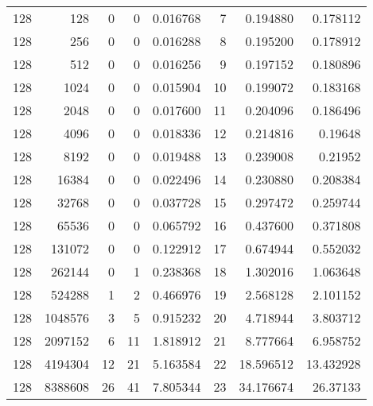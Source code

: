\begin{longtable}[c]{@{}rrrrrrrr@{}}
    128       & 128       & 0         & 0        & 0.016768    & 7                   & 0.194880    & 0.178112   \\
    128       & 256       & 0         & 0        & 0.016288    & 8                   & 0.195200    & 0.178912   \\
    128       & 512       & 0         & 0        & 0.016256    & 9                   & 0.197152    & 0.180896   \\
    128       & 1024      & 0         & 0        & 0.015904    & 10                  & 0.199072    & 0.183168   \\
    128       & 2048      & 0         & 0        & 0.017600    & 11                  & 0.204096    & 0.186496   \\
    128       & 4096      & 0         & 0        & 0.018336    & 12                  & 0.214816    & 0.19648    \\
    128       & 8192      & 0         & 0        & 0.019488    & 13                  & 0.239008    & 0.21952    \\
    128       & 16384     & 0         & 0        & 0.022496    & 14                  & 0.230880    & 0.208384   \\
    128       & 32768     & 0         & 0        & 0.037728    & 15                  & 0.297472    & 0.259744   \\
    128       & 65536     & 0         & 0        & 0.065792    & 16                  & 0.437600    & 0.371808   \\
    128       & 131072    & 0         & 0        & 0.122912    & 17                  & 0.674944    & 0.552032   \\
    128       & 262144    & 0         & 1        & 0.238368    & 18                  & 1.302016    & 1.063648   \\
    128       & 524288    & 1         & 2        & 0.466976    & 19                  & 2.568128    & 2.101152   \\
    128       & 1048576   & 3         & 5        & 0.915232    & 20                  & 4.718944    & 3.803712   \\
    128       & 2097152   & 6         & 11       & 1.818912    & 21                  & 8.777664    & 6.958752   \\
    128       & 4194304   & 12        & 21       & 5.163584    & 22                  & 18.596512   & 13.432928  \\
    128       & 8388608   & 26        & 41       & 7.805344    & 23                  & 34.176674   & 26.37133   \\

\end{longtable}
